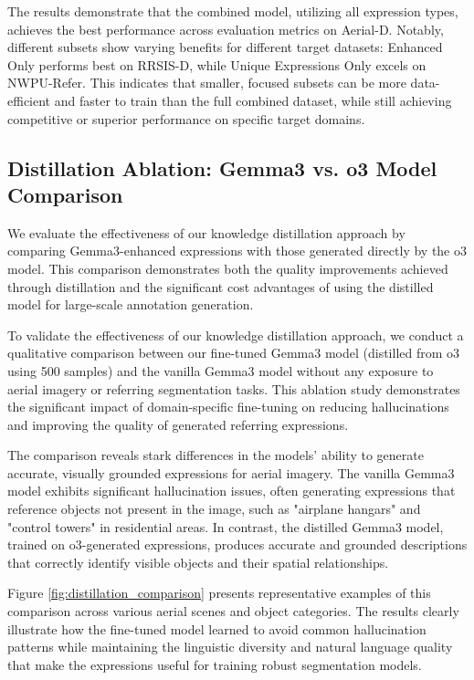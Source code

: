 The results demonstrate that the combined model, utilizing all expression types, achieves the best performance across evaluation metrics on Aerial-D. Notably, different subsets show varying benefits for different target datasets: Enhanced Only performs best on RRSIS-D, while Unique Expressions Only excels on NWPU-Refer. This indicates that smaller, focused subsets can be more data-efficient and faster to train than the full combined dataset, while still achieving competitive or superior performance on specific target domains.


\subsection{Distillation Ablation: Gemma3 vs. o3 Model Comparison}
\label{subsec:distillation_ablation}

We evaluate the effectiveness of our knowledge distillation approach by comparing Gemma3\cite{gemma3}-enhanced expressions with those generated directly by the o3 model\cite{o3}. This comparison demonstrates both the quality improvements achieved through distillation and the significant cost advantages of using the distilled model for large-scale annotation generation.

To validate the effectiveness of our knowledge distillation approach, we conduct a qualitative comparison between our fine-tuned Gemma3 model (distilled from o3 using 500 samples) and the vanilla Gemma3 model without any exposure to aerial imagery or referring segmentation tasks. This ablation study demonstrates the significant impact of domain-specific fine-tuning on reducing hallucinations and improving the quality of generated referring expressions.

The comparison reveals stark differences in the models' ability to generate accurate, visually grounded expressions for aerial imagery. The vanilla Gemma3 model exhibits significant hallucination issues, often generating expressions that reference objects not present in the image, such as "airplane hangars" and "control towers" in residential areas. In contrast, the distilled Gemma3 model, trained on o3-generated expressions, produces accurate and grounded descriptions that correctly identify visible objects and their spatial relationships.

Figure \ref{fig:distillation_comparison} presents representative examples of this comparison across various aerial scenes and object categories. The results clearly illustrate how the fine-tuned model learned to avoid common hallucination patterns while maintaining the linguistic diversity and natural language quality that make the expressions useful for training robust segmentation models.

